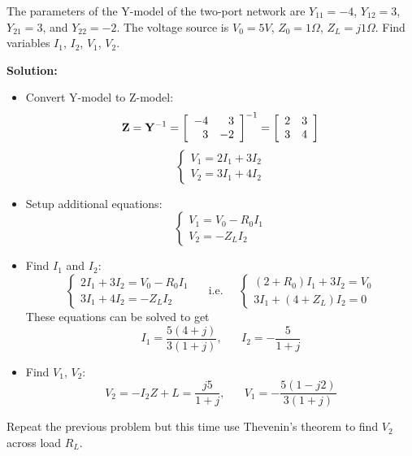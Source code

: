 \item The parameters of the Y-model of the two-port network are
$Y_{11}=-4$, $Y_{12}=3$, $Y_{21}=3$, and $Y_{22}=-2$. The voltage source
is $V_0=5V$, $Z_0=1\Omega$, $Z_L=j1\Omega$. Find variables $I_1$, $I_2$, $V_1$, $V_2$.


 {\bf Solution:} 
 \begin{itemize}
 \item Convert Y-model to Z-model:
   \[ {\bf Z}={\bf Y}^{-1}=\left[ \begin{array}{rr}-4 & 3 \\ 3 & -2\end{array} \right]^{-1}
   =\left[ \begin{array}{rr}2 & 3 \\ 3 & 4\end{array} \right] \]
   \[ \left\{ \begin{array}{l} V_1=2I_1+3I_2 \\ V_2=3I_1+4I_2 \end{array} \right. \]
 \item Setup additional equations:
   \[ \left\{ \begin{array}{l} V_1=V_0-R_0I_1 \\ V_2=-Z_L I_2 \end{array} \right. \]
 \item Find $I_1$ and $I_2$:
   \[ \left\{ \begin{array}{l} 2I_1+3I_2=V_0-R_0I_1\\ 3I_1+4I_2=-Z_LI_2\end{array}\right. 
     \;\;\;\;\;\mbox{i.e.}\;\;\;\;\;
   \left\{ \begin{array}{l} (2+R_0)I_1+3I_2=V_0\\ 3I_1+(4+Z_L)I_2=0\end{array}\right. \]
     These equations can be solved to get
     \[ I_1=\frac{5(4+j)}{3(1+j)},\;\;\;\;\;\;I_2=-\frac{5}{1+j}\]
 \item Find $V_1$, $V_2$:
   \[ V_2=-I_2Z+L=\frac{j5}{1+j},\;\;\;\;\;\; V_1=-\frac{5(1-j2)}{3(1+j)} \]
 \end{itemize}

\item Repeat the previous problem but this time use Thevenin's theorem to find
$V_2$ across load $R_L$.

